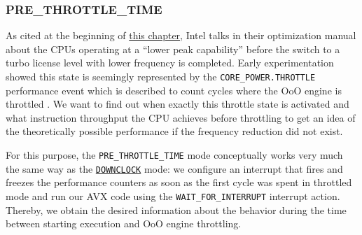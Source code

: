 \subsubsection{PRE\_THROTTLE\_TIME}
\label{sec:analysis:design:measurementmodes:prethrottlethroughput}

As cited at the beginning of \hyperref[sec:analysis]{this chapter}, Intel talks in their optimization manual \cite{inteloptimizationmanual} about the \glspl{CPU} operating at a \enquote{lower peak capability} before the switch to a turbo license level with lower frequency is completed. Early experimentation showed this state is seemingly represented by the \texttt{CORE\_POWER.THROTTLE} performance event which is described to count cycles where the \gls{OoO} engine is throttled \cite{intelsdmsysprogguide}. We want to find out when exactly this throttle state is activated and what instruction throughput the \gls{CPU} achieves before throttling to get an idea of the theoretically possible performance if the frequency reduction did not exist.

For this purpose, the \texttt{PRE\_THROTTLE\_TIME} mode conceptually works very much the same way as the \hyperref[sec:analysis:design:measurementmodes:downclock]{\texttt{DOWNCLOCK}} mode: we configure an interrupt that fires and freezes the performance counters as soon as the first cycle was spent in throttled mode and run our \gls{AVX} code using the \texttt{WAIT\_FOR\_INTERRUPT} interrupt action. Thereby, we obtain the desired information about the behavior during the time between starting execution and \gls{OoO} engine throttling.

